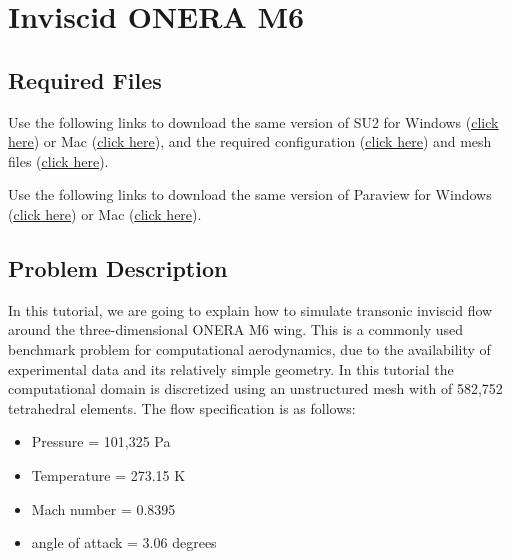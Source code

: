 \chapter{Inviscid ONERA M6}
\label{ch:Inviscid ONERA M6}
\section{Required Files}
\begin{su2note}
	Use the following links to download the same version of SU2 for Windows (\href{https://users.encs.concordia.ca/~bvermeir/book/executables/windows/SU2-v7.0.0-win64.zip}{\underline{click here}}) or Mac (\href{https://users.encs.concordia.ca/~bvermeir/book/executables/osx/SU2-v7.0.0-macos64.zip}{\underline{click here}}), and the required configuration (\href{https://gitlab.com/bvermeir/book-cfd/blob/master/tutorial/tut3_invisicd_oneram6/inv_ONERAM6.cfg}{\underline{click here}}) and mesh files (\href{https://gitlab.com/bvermeir/book-cfd/blob/master/tutorial/tut3_invisicd_oneram6/mesh_ONERAM6_inv.su2}{\underline{click here}}).
\end{su2note}
\begin{paraviewnote}
	Use the following links to download the same version of Paraview for Windows (\href{https://users.encs.concordia.ca/~bvermeir/book/executables/windows/ParaView-5.4.0-Qt5-OpenGL2-Windows-64bit.exe}{\underline{click here}}) or Mac (\href{https://users.encs.concordia.ca/~bvermeir/book/executables/osx/ParaView-5.4.0-Qt5-OpenGL2-MPI-OSX10.8-64bit.dmg}{\underline{click here}}).
\end{paraviewnote}

\section{Problem Description}
In this tutorial, we are going to explain how to simulate transonic inviscid flow around the three-dimensional ONERA M6 wing. This is a commonly used benchmark problem for computational aerodynamics, due to the availability of experimental data and its relatively simple geometry. In this tutorial the computational domain is discretized using an unstructured mesh with of 582,752 tetrahedral elements. The flow specification is as follows:
\begin{itemize}
    \item Pressure = 101,325 Pa
    \item Temperature = 273.15 K
    \item Mach number = 0.8395
    \item angle of attack = 3.06 degrees
\end{itemize}

